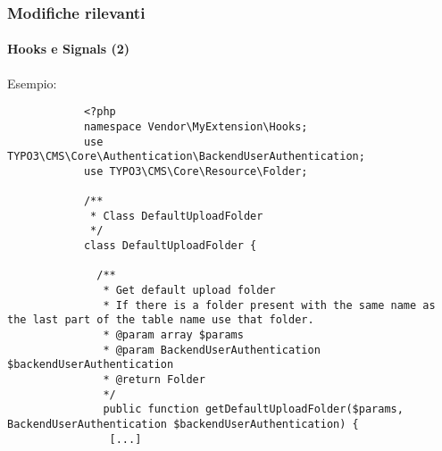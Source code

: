 \begin{frame}[fragile]
	\frametitle{Modifiche rilevanti}
	\framesubtitle{Hooks e Signals (2)}

	\lstset{basicstyle=\tiny\ttfamily}

	\small Esempio:\normalsize

		\begin{lstlisting}
			<?php
			namespace Vendor\MyExtension\Hooks;
			use TYPO3\CMS\Core\Authentication\BackendUserAuthentication;
			use TYPO3\CMS\Core\Resource\Folder;

			/**
			 * Class DefaultUploadFolder
			 */
			class DefaultUploadFolder {

			  /**
			   * Get default upload folder
			   * If there is a folder present with the same name as the last part of the table name use that folder.
			   * @param array $params
			   * @param BackendUserAuthentication $backendUserAuthentication
			   * @return Folder
			   */
			   public function getDefaultUploadFolder($params, BackendUserAuthentication $backendUserAuthentication) {
			    [...]
		\end{lstlisting}

\end{frame}

